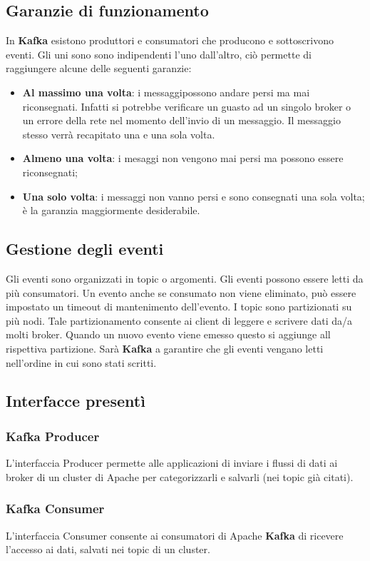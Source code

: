 \documentclass{article}
\begin{document}
\subsection{Garanzie di funzionamento}
In \textbf{Kafka} esistono produttori e consumatori che producono e sottoscrivono eventi. 
Gli uni sono sono indipendenti l'uno dall'altro, ciò permette di raggiungere alcune delle seguenti garanzie:
\begin{itemize}
    \item \textbf{Al massimo una volta}: i messaggipossono andare persi ma mai riconsegnati. Infatti si potrebbe verificare un guasto ad un singolo broker o un errore della rete nel momento dell'invio di un messaggio. Il messaggio stesso verrà recapitato una e una sola volta.
    \item \textbf{Almeno una volta}: i mesaggi non 		vengono mai persi ma possono essere 		riconsegnati;
    \item \textbf{Una solo volta}: i messaggi non  		vanno persi e sono consegnati una 		sola volta; è la garanzia maggiormente desiderabile.
\end{itemize}
\subsection{Gestione degli eventi}
Gli eventi sono organizzati in topic o argomenti. Gli eventi possono essere letti da più consumatori. 
Un evento anche se consumato non viene eliminato, può essere impostato un timeout di mantenimento dell'evento.
I topic sono partizionati su più nodi. Tale partizionamento consente ai client di leggere e scrivere dati da/a molti broker. Quando un nuovo evento viene emesso questo si aggiunge all rispettiva partizione. Sarà \textbf{\textbf{Kafka}} a garantire che gli eventi vengano letti nell'ordine in cui sono stati scritti.
\subsection{Interfacce presentì}
\subsubsection{\textbf{Kafka} Producer}
L’interfaccia Producer permette alle applicazioni di inviare i flussi di dati ai broker di un cluster di Apache per categorizzarli e salvarli (nei topic già citati).
\subsubsection{\textbf{Kafka} Consumer}
L’interfaccia Consumer consente ai consumatori di Apache \textbf{Kafka} di  ricevere l’accesso ai dati, salvati nei topic di un cluster.
\end{document}
